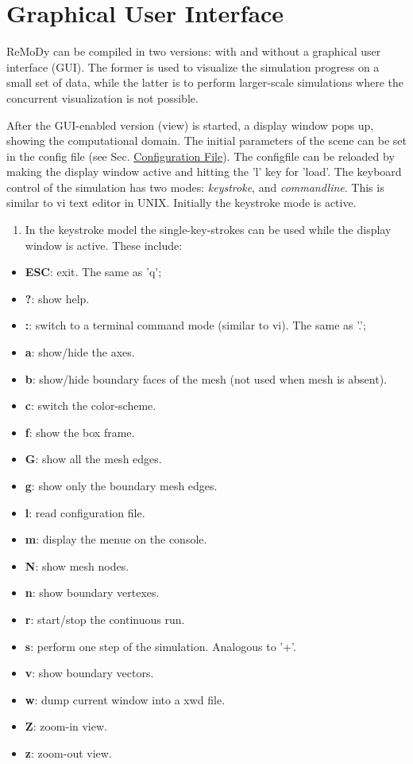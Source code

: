 \hypertarget{GUI_SecGUI}{}\section{Graphical User Interface}\label{GUI_SecGUI}
ReMoDy can be compiled in two versions: with and without a graphical user interface (GUI). The former is used to visualize the simulation progress on a small set of data, while the latter is to perform larger-scale simulations where the concurrent visualization is not possible.

After the GUI-enabled version (view) is started, a display window pops up, showing the computational domain. The initial parameters of the scene can be set in the config file (see Sec. \hyperlink{Configfile_SecConfig}{Configuration File}). The configfile can be reloaded by making the display window active and hitting the 'l' key for 'load'. The keyboard control of the simulation has two modes: {\em keystroke\/}, and {\em commandline\/}. This is similar to vi text editor in UNIX. Initially the keystroke mode is active.

\begin{enumerate}
\item In the keystroke model the single-key-strokes can be used while the display window is active. These include:\end{enumerate}


\begin{itemize}
\item {\bf ESC}: exit. The same as 'q';\item {\bf ?}: show help.\item {\bf :}: switch to a terminal command mode (similar to vi). The same as '.';\item {\bf a}: show/hide the axes.\item {\bf b}: show/hide boundary faces of the mesh (not used when mesh is absent).\item {\bf c}: switch the color-scheme.\item {\bf f}: show the box frame.\item {\bf G}: show all the mesh edges.\item {\bf g}: show only the boundary mesh edges.\item {\bf l}: read configuration file.\item {\bf m}: display the menue on the console.\item {\bf N}: show mesh nodes.\item {\bf n}: show boundary vertexes.\item {\bf r}: start/stop the continuous run.\item {\bf s}: perform one step of the simulation. Analogous to '+'.\item {\bf v}: show boundary vectors.\item {\bf w}: dump current window into a xwd file.\item {\bf Z}: zoom-in view.\item {\bf z}: zoom-out view.\end{itemize}


